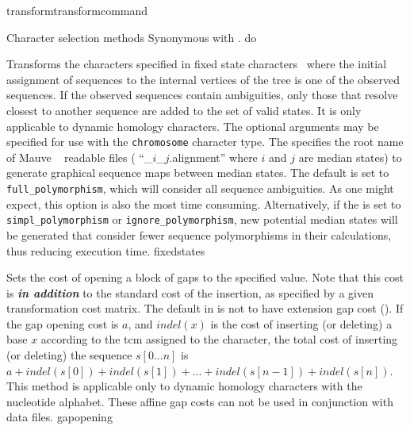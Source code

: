 \begin{command}{transform}{transformcommand}
\begin{arguments}
\begin{argumentgroup}{Character selection methods}
{Synonymous with .}
{do}

{Transforms the characters specified in fixed state characters~\cite{wheeler1999a}
where the initial assignment of sequences to the internal vertices of
the tree is one of the observed sequences. If the observed sequences
contain ambiguities, only those that resolve closest to another
sequence are added to the set of valid states. It is only
applicable to dynamic homology characters. The optional arguments 
may be specified for use with the \texttt{chromosome} character type. 
The \poystring specifies the root name of Mauve ~\cite{darlingetal2004} 
readable files ( ``\poystring\_$i$\_$j$.alignment'' where $i$ and $j$ are 
median states) to generate graphical sequence maps between median states. 
The default \poylident is set to \texttt{full\_polymorphism}, which will 
consider all sequence ambiguities. As one might expect, this option is also the most 
time consuming. Alternatively, if the \poylident is set to \texttt{simpl\_polymorphism} 
or \texttt{ignore\_polymorphism}, new potential median states will be generated that consider fewer 
sequence polymorphisms in their calculations, thus reducing execution time.}
{fixedstates}

{Sets the cost of opening a block of gaps to the specified value. Note that
this cost is {\bf \emph{in addition}} to the standard cost of the insertion, as
specified by a given transformation cost matrix.
The default in \poy is not to have extension
gap cost (). If the gap
opening cost is
$a$, and $indel(x)$ is the cost of inserting (or deleting) a
base $x$ according to the tcm assigned to the character, the total
cost of inserting (or deleting) the sequence $s[0...n]$ is $a +
indel(s[0]) + indel(s[1]) + ... + indel(s[n - 1]) + indel(s[n]).$
This method is applicable only to dynamic homology characters with
the nucleotide alphabet. These affine gap costs can not be used
in conjunction with  data files.} 
{gapopening}


\end{argumentgroup}
\end{arguments}
\end{command}
